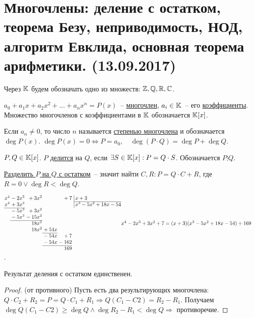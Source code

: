 \section{Многочлены: деление с остатком, теорема Безу, неприводимость, НОД, алгоритм Евклида, основная теорема арифметики. (13.09.2017)}

Через $\mathbb{K}$ будем обозначать одно из множеств: $\mathbb{Z}, \mathbb{Q}, \mathbb{R}, \mathbb{C}$.

\begin{defin}
	$a_{0}+a_{1}x+a_{2}x^{2}+\ldots+a_{n}x^{n}=P(x)$~-- \underline{многочлен}, $a_i \in \mathbb{K}$~-- его \underline{коэффициенты}. Множество многочленов с коэффициентами в $\mathbb{K}$ обозначается $\mathbb{K}[x]$.
\end{defin}
\begin{defin}
	Если $a_{n} \neq 0$, то число $n$ называется \underline{степенью многочлена} и обозначается $\deg{P(x)}$. $\deg{P(x)} = 0 \Leftrightarrow P=a_0, \quad \deg(P \cdot Q) = \deg{P} + \deg{Q}$.
\end{defin}

\begin{defin}
	$P,Q \in \mathbb{K}[x]$. $P$ \underline{делится} на $Q$, если $\exists S \in \mathbb{K}[x]: P = Q \cdot S$. Обозначается $P \vdots Q$.
\end{defin}
\begin{defin}
	\underline{Разделить $P$ на $Q$ с остатком}~-- значит найти $C, R: P = Q \cdot C + R$, где $R=0 \lor \deg  R < \deg  Q$.
\end{defin}
\begin{ex}
	$\arraycolsep=0.05em
	\begin{array}{rrrrrrr@{\,}l|l}
		x^4&{} -2x^3&{} +3x^2&{}&{} +7&&&&\, x+3 \\
		\cline{9-1} x^4&{} +3x^3&&&&&&&\, x^3-5x^2+18x-54 \\
		\cline{1-2} &{} -5x^3&{} +3x^2&{} \\
		&{} -5x^3&{} -15x^2&{} \\
		\cline{2-3} &{}&{} 18x^2&{} \\
		&{}&{} 18x^2&{} + 54x&{} \\
		\cline{4-3} &{}&{}&{} -54x&{} + 7&{} \\
		&{}&{}&{} -54x&{} -162&{} \\
		\cline{4-5} &{}&{}&{}&{} 169
	\end{array} \\
	x^4-2x^3+3x^2+7 = (x+3)(x^3-5x^2+18x-54) + 169$.
\end{ex}

\begin{claim}
	Результат деления с остатком единственен.
\end{claim}
\begin{proof}
	(от противного) Пусть есть два результирующих многочлена: $Q \cdot C_{2} + R_{2} = P = Q \cdot C_{1} + R_{1} \Rightarrow Q(C_{1} - C{2}) = R_{2} - R_{1}$. Получаем $\deg Q(C_{1}-C{2}) \ge \deg Q \land \deg R_{2} - R_{1} < \deg Q \Rightarrow$ противоречие.
\end{proof}

